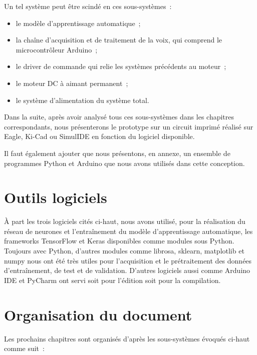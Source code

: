 \documentclass[a4paper,12pt,twoside]{report}
\theoremstyle{definition}
\theoremstyle{plain}
\theoremstyle{remark}
\begin{document}
Un tel système peut être scindé en ces sous-systèmes~:
\begin{itemize}
	\item le modèle d'apprentissage automatique~;
	\item la chaîne d'acquisition et de traitement de la voix, qui comprend le
	      microcontrôleur Arduino~;
	\item le driver de commande qui relie les systèmes précédents au moteur~;
	\item le moteur DC à aimant permanent~;
	\item le système d'alimentation du système total.
\end{itemize}

Dans la suite, après avoir analysé tous ces sous-systèmes dans les chapitres correspondants,
nous présenterons le prototype sur un circuit imprimé réalisé sur Eagle, Ki-Cad ou SimulIDE
en fonction du logiciel disponible.

Il faut également ajouter que nous présentons, en annexe, un ensemble de programmes Python et
Arduino que nous avons utilisés dans cette conception.

\section*{Outils logiciels}

À part les trois logiciels cités ci-haut, nous avons utilisé, pour la réalisation du réseau
de neurones et l'entraînement du modèle d'apprentissage automatique, les frameworks TensorFlow
et Keras disponibles comme modules sous Python. Toujours avec Python, d'autres modules comme
librosa, sklearn, matplotlib et numpy nous ont été très utiles pour l'acquisition et le
prétraitement des données d'entraînement, de test et de validation. D'autres logiciels aussi
comme Arduino \ac{IDE} et PyCharm ont servi soit pour l'édition soit pour la compilation.

\section*{Organisation du document}

Les prochains chapitres sont organisés d'après les sous-systèmes évoqués ci-haut comme suit~:
\end{document}
